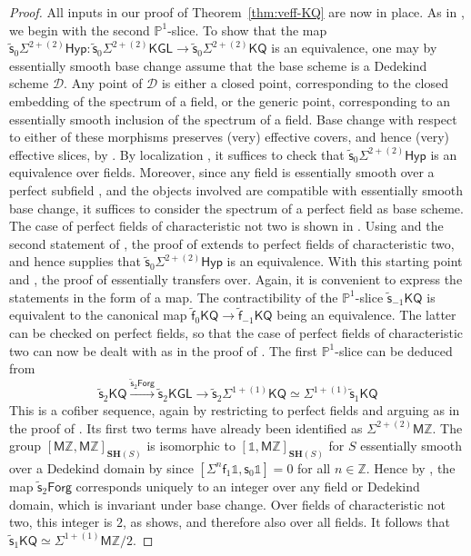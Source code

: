 \documentclass[11pt,hyp,english]{article}
\newcommand{\Z}{\mathbb{Z}}
\newcommand{\unit}{\mathds{1}}
\renewcommand{\P}{\mathbb{P}}
\newcommand{\KGL}{\mathsf{KGL}}
\newcommand{\KQ}{\mathsf{KQ}}
\newcommand{\MZ}{\mathsf{M}\Z}
\newcommand{\SH}{\mathbf{SH}}
\newcommand{\s}{\mathsf{s}}
\newcommand{\vs}{\tilde{\mathsf{s}}}
\newcommand{\f}{\mathsf{f}}
\newcommand{\vf}{\tilde{{\mathsf{f}}}}
\newcommand{\Forg}{\mathsf{Forg}}
\newcommand{\Hyper}{\mathsf{Hyp}}
\theoremstyle{definition}
\begin{document}
\begin{proof}
All inputs in our proof of Theorem~\ref{thm:veff-KQ} are now in place.
As in \cite{Bachmann}, we begin with the second $\P^1$-slice.
To show that the map 
$\vs_0\Sigma^{2+(2)}\Hyper\colon \vs_0\Sigma^{2+(2)}\KGL\to \vs_0\Sigma^{2+(2)}\KQ$
is an equivalence, one may by essentially smooth base change assume that the base scheme is a Dedekind scheme $\mathcal{D}$.
Any point of $\mathcal{D}$ is either a closed point, corresponding to the closed embedding of the spectrum of a field, or the generic point, corresponding to an essentially smooth inclusion of the spectrum of a field.
Base change with respect to either of these morphisms preserves (very) effective covers, and hence (very) effective slices, by \cite[Lemma B.1, Lemma B.2]{bachmann-hoyois}.
By localization \cite[Prop.~B.3]{bachmann-hoyois}, it suffices to check that $\vs_0\Sigma^{2+(2)}\Hyper$ is an equivalence over fields.
Moreover, since any field is essentially smooth over a perfect subfield \cite[Lemma A.2]{hoyois.mgl-mz}, and the objects involved are compatible with essentially smooth base change, it suffices to consider the spectrum of a perfect field as base scheme.
The case of perfect fields of characteristic not two is shown in \cite[Lemma 13]{Bachmann}.
Using  and the second statement of , the proof of \cite[Lemma 13]{Bachmann} extends to perfect fields of characteristic two, and hence supplies that $\vs_0\Sigma^{2+(2)}\Hyper$ is an equivalence. 
With this starting point and , the proof of \cite[Theorem 16]{Bachmann} essentially transfers over. 
Again, it is convenient to express the statements in the form of a map.
The contractibility of the $\P^1$-slice $\vs_{-1}\KQ$ is equivalent to the canonical map $\vf_0\KQ\to \vf_{-1}\KQ$ being an equivalence.
The latter can be checked on perfect fields, so that the case of perfect fields of characteristic two can now be dealt with as in the proof of \cite[Theorem 16]{Bachmann}.
The first $\P^1$-slice can be deduced from 
\[ \vs_2\KQ\xrightarrow{\vs_2\Forg} \vs_2\KGL \to \vs_2\Sigma^{1+(1)}\KQ\simeq \Sigma^{1+(1)}\vs_1\KQ\]
This is a cofiber sequence, again by restricting to perfect fields and arguing as in the proof of \cite[Theorem 16]{Bachmann}.
Its first two terms have already been identified as $\Sigma^{2+(2)}\MZ$.
The group $[\MZ,\MZ]_{\SH(S)}$ is isomorphic to $[\unit,\MZ]_{\SH(S)}$ for $S$ essentially smooth over a Dedekind domain by 
\cite[Theorem B.5]{bachmann-hoyois} since $[\Sigma^n\f_1\unit,\s_0\unit]=0$ for all $n\in \Z$.
Hence by , the map $\vs_2\Forg$ corresponds uniquely to an integer over any field or Dedekind domain, which is invariant under base change.
Over fields of characteristic not two, this integer is $2$, as \cite{RO:slices} shows, and therefore also over all fields.
It follows that $\vs_1\KQ\simeq \Sigma^{1+(1)}\MZ/2$.
\end{proof}
\end{document}
